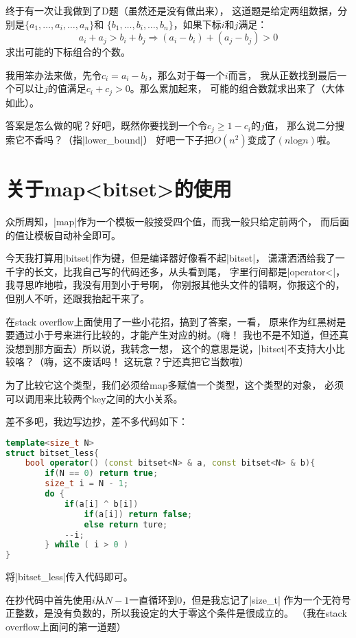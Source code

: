 终于有一次让我做到了D题（虽然还是没有做出来），
这道题是给定两组数据，分别是$\{a_1,\ldots,a_i,\ldots,a_n\}$和
$\{b_1,\ldots,b_i,\ldots,b_n\}$，如果下标$i$和$j$满足：
$$a_i+a_j>b_i+b_j\Rightarrow (a_i-b_i)+(a_j-b_j)>0$$
求出可能的下标组合的个数。

我用笨办法来做，先令$c_i=a_i-b_i$，那么对于每一个$i$而言，
我从正数找到最后一个可以让$j$的值满足$c_i+c_j>0$。那么累加起来，
可能的组合数就求出来了（大体如此）。

答案是怎么做的呢？好吧，既然你要找到一个令$c_j\ge 1-c_i$的$j$值，
那么说二分搜索它不香吗？（指\vb|lower\_bound|）
好吧一下子把$O(n^2)$变成了$(n\text{log}n)$啦。


\section{关于map<bitset>的使用}

众所周知，\vb|map|作为一个模板一般接受四个值，而我一般只给定前两个，
而后面的值让模板自动补全即可。

今天我打算用\vb|bitset|作为键，但是编译器好像看不起\vb|bitset|，
潇潇洒洒给我了一千字的长文，比我自己写的代码还多，从头看到尾，
字里行间都是\vb|operator<|，我寻思咋地啦，我没有用到小于号啊，
你别报其他头文件的错啊，你报这个的，但别人不听，还跟我抬起干来了。

在stack overflow上面使用了一些小花招，搞到了答案，一看，
原来作为红黑树是要通过小于号来进行比较的，才能产生对应的树。(嗨！
我也不是不知道，但还真没想到那方面去）所以说，我转念一想，
这个的意思是说，\vb|bitset|不支持大小比较咯？（嗨，这不废话吗！
这玩意？宁还真把它当数啦）

为了比较它这个类型，我们必须给map多赋值一个类型，这个类型的对象，
必须可以调用来比较两个key之间的大小关系。

差不多吧，我边写边抄，差不多代码如下：
\begin{lstlisting}[language=C++]
template<size_t N>
struct bitset_less{
    bool operator() (const bitset<N> & a, const bitset<N> & b){
        if(N == 0) return true;
        size_t i = N - 1;
        do {
            if(a[i] ^ b[i])
                if(a[i]) return false;
                else return ture;
            --i;
        } while ( i > 0 )
}
\end{lstlisting}

将\vb|bitset\_less|传入代码即可。

在抄代码中首先使用$i$从$N-1$一直循环到$0$，但是我忘记了\vb|size\_t|
作为一个无符号正整数，是没有负数的，所以我设定的大于零这个条件是很成立的。
（我在stack overflow上面问的第一道题）

